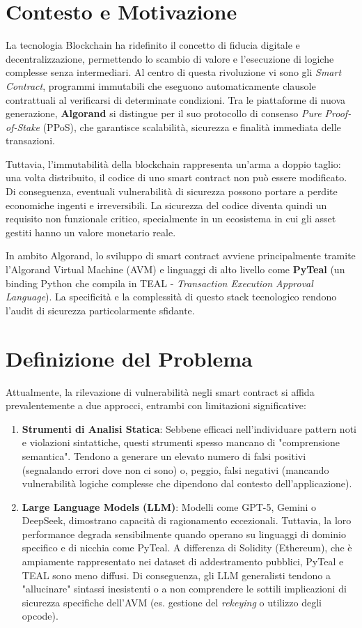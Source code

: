 \section{Contesto e Motivazione}
La tecnologia Blockchain ha ridefinito il concetto di fiducia digitale e decentralizzazione, permettendo lo scambio di valore e l'esecuzione di logiche complesse senza intermediari. Al centro di questa rivoluzione vi sono gli \textit{Smart Contract}, programmi immutabili che eseguono automaticamente clausole contrattuali al verificarsi di determinate condizioni. Tra le piattaforme di nuova generazione, \textbf{Algorand} si distingue per il suo protocollo di consenso \textit{Pure Proof-of-Stake} (PPoS), che garantisce scalabilità, sicurezza e finalità immediata delle transazioni.

Tuttavia, l'immutabilità della blockchain rappresenta un'arma a doppio taglio: una volta distribuito, il codice di uno smart contract non può essere modificato. Di conseguenza, eventuali vulnerabilità di sicurezza possono portare a perdite economiche ingenti e irreversibili. La sicurezza del codice diventa quindi un requisito non funzionale critico, specialmente in un ecosistema in cui gli asset gestiti hanno un valore monetario reale.

In ambito Algorand, lo sviluppo di smart contract avviene principalmente tramite l'Algorand Virtual Machine (AVM) e linguaggi di alto livello come \textbf{PyTeal} (un binding Python che compila in TEAL - \textit{Transaction Execution Approval Language}). La specificità e la complessità di questo stack tecnologico rendono l'audit di sicurezza particolarmente sfidante.

\section{Definizione del Problema}
Attualmente, la rilevazione di vulnerabilità negli smart contract si affida prevalentemente a due approcci, entrambi con limitazioni significative:

\begin{enumerate}
    \item \textbf{Strumenti di Analisi Statica}: Sebbene efficaci nell'individuare pattern noti e violazioni sintattiche, questi strumenti spesso mancano di "comprensione semantica". Tendono a generare un elevato numero di falsi positivi (segnalando errori dove non ci sono) o, peggio, falsi negativi (mancando vulnerabilità logiche complesse che dipendono dal contesto dell'applicazione).
    
    \item \textbf{Large Language Models (LLM)}: Modelli come GPT-5, Gemini o DeepSeek, dimostrano capacità di ragionamento eccezionali. Tuttavia, la loro performance degrada sensibilmente quando operano su linguaggi di dominio specifico e di nicchia come PyTeal. A differenza di Solidity (Ethereum), che è ampiamente rappresentato nei dataset di addestramento pubblici, PyTeal e TEAL sono meno diffusi. Di conseguenza, gli LLM generalisti tendono a "allucinare" sintassi inesistenti o a non comprendere le sottili implicazioni di sicurezza specifiche dell'AVM (es. gestione del \textit{rekeying} o utilizzo degli opcode).
\end{enumerate}

